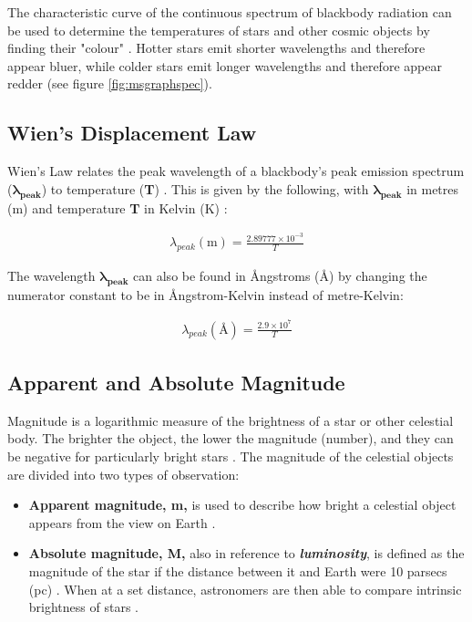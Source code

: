 \documentclass[12pt]{article}
\begin{document}
The characteristic curve of the continuous spectrum of blackbody radiation can be used to determine the temperatures of stars and other cosmic objects by finding their "colour" \cite{ESAblackbodyrad}.
Hotter stars emit shorter wavelengths and therefore appear bluer, while colder stars emit longer wavelengths and therefore appear redder (see figure \ref{fig:msgraphspec}).


\subsection{Wien's Displacement Law}

Wien's Law relates the peak wavelength of a blackbody's peak emission spectrum ($\mathbf{\lambda_{peak}}$) to temperature (\textbf{T}) \cite{derivwien}.
This is given by the following, with $\mathbf{\lambda_{peak}}$ in metres (m) and temperature \textbf{T} in Kelvin (K) \cite{derivwien}:

\vspace{-1.5ex}
\begin{gather}
    \lambda_{peak} (\text{m}) = \frac{2.89777 \times 10 ^{-3}}{T} 
\end{gather}

The wavelength $\mathbf{\lambda_{peak}}$ can also be found in Ångstroms (Å) by changing the numerator constant to be in Ångstrom-Kelvin instead of metre-Kelvin:

\vspace{-1.5ex}
\begin{gather}
    \lambda_{peak} (\text{\AA}) = \frac{2.9 \times 10^7}{T}
\end{gather}

\subsection{Apparent and Absolute Magnitude} \label{sec:1.1.3}

Magnitude is a logarithmic measure of the brightness of a star or other celestial body. The brighter the object, the lower the magnitude (number), and they can be negative for particularly bright stars
\cite{britmag}.
The magnitude of the celestial objects are divided into two types of observation:

\begin{itemize}
    \item \textbf{Apparent magnitude, m,} is used to describe how bright a celestial object appears from the view on Earth
    \cite{lcomag}.
    \item \textbf{Absolute magnitude, M,} also in reference to \textbf{\textit{luminosity}}, is defined as the magnitude of the star if the distance between it and Earth were 10 parsecs (pc)
    \cite{lcoabsmag,cosmosabsmag}.
    When at a set distance, astronomers are then able to compare intrinsic brightness of stars
    \cite{cosmosabsmag}.
\end{itemize}
\end{document}
